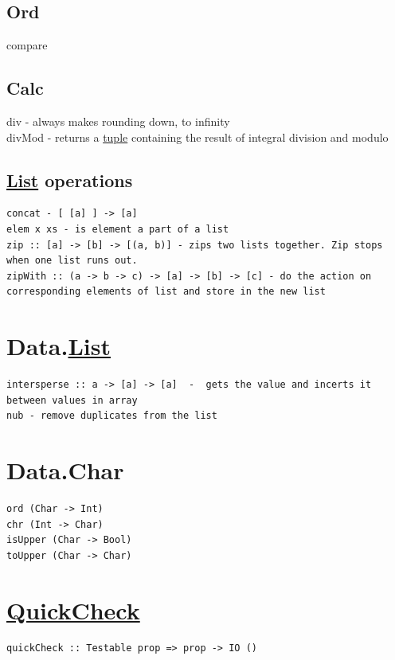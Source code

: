 \documentclass[a4paper,14pt,oneside]{book}
\begin{document}
{\section{Ord}
\label{sec:orgd6370d4}
compare\\

\section{Calc}
\label{sec:org8e2d4c9}
div - always makes rounding down, to infinity\\
divMod - returns a \hyperref[org666c273]{tuple} containing the result of integral division and modulo\\

\section{\hyperref[org47d56c8]{List} operations}
\label{sec:org269e8da}
\begin{verbatim}
concat - [ [a] ] -> [a]
elem x xs - is element a part of a list
zip :: [a] -> [b] -> [(a, b)] - zips two lists together. Zip stops when one list runs out.
zipWith :: (a -> b -> c) -> [a] -> [b] -> [c] - do the action on corresponding elements of list and store in the new list
\end{verbatim}

\chapter{Data.\hyperref[org47d56c8]{List}}
\label{sec:orgd761180}
\begin{verbatim}
intersperse :: a -> [a] -> [a]  -  gets the value and incerts it between values in array
nub - remove duplicates from the list
\end{verbatim}

\chapter{Data.Char}
\label{sec:orgcac0772}
\begin{verbatim}
ord (Char -> Int)
chr (Int -> Char)
isUpper (Char -> Bool)
toUpper (Char -> Char)
\end{verbatim}

\chapter{\hyperref[org70b9ba4]{QuickCheck}}
\label{sec:orgcacf9fe}
\begin{verbatim}
quickCheck :: Testable prop => prop -> IO ()


\end{verbatim}}
\end{document}

